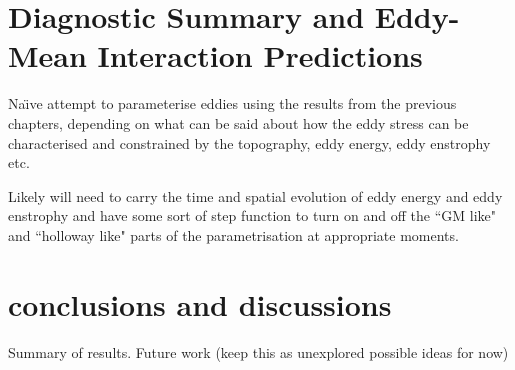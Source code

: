\documentclass[12pt,a4paper]{report}
\begin{document}
\chapter{Diagnostic Summary and Eddy-Mean Interaction Predictions}

Na\"{\i}ve attempt to parameterise eddies using the 
results from the previous chapters, depending
on what can be said about how the eddy stress can
be characterised and constrained by the topography,
eddy energy, eddy enstrophy etc. 

Likely will need to carry the time and spatial
evolution of eddy energy and eddy enstrophy and have
some sort of step function to turn on and off the
``GM like" and ``holloway like" parts of the parametrisation at appropriate moments.


\chapter{conclusions and discussions}

Summary of results.
Future work (keep this as unexplored possible ideas for now)

	 \printbibliography
\end{document}
